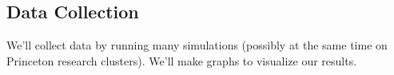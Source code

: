 \documentclass[twoside,twocolumn]{article}
\begin{document}
\subsection{Data Collection}

We'll collect data by running many simulations (possibly at the same time on Princeton research clusters).
We'll make graphs to visualize our results.


\nocite{*}



\end{document}
